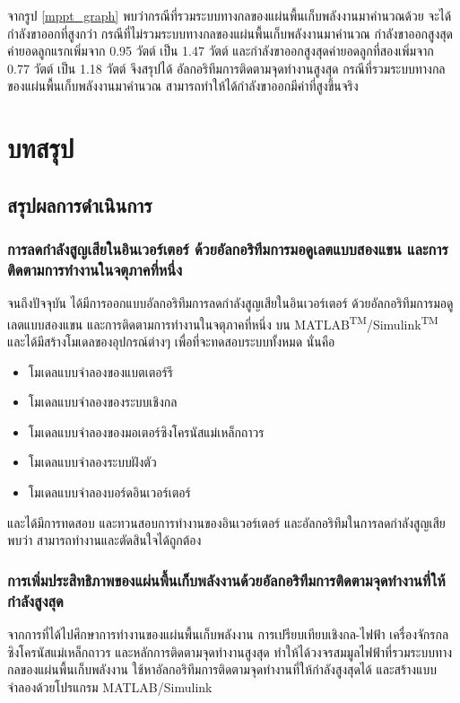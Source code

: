 \documentclass[11pt,a4paper]{article}
\begin{document}
จากรูป \ref{mppt_graph} พบว่ากรณีที่รวมระบบทางกลของแผ่นพื้นเก็บพลังงานมาคำนวณด้วย จะได้กำลังขาออกที่สูงกว่า กรณีที่ไม่รวมระบบทางกลของแผ่นพื้นเก็บพลังงานมาคำนวณ
กำลังขาออกสูงสุดค่ายอดลูกแรกเพิ่มจาก 0.95 วัตต์ เป็น 1.47 วัตต์ และกำลังขาออกสูงสุดค่ายอดลูกที่สองเพิ่มจาก 0.77 วัตต์ เป็น 1.18 วัตต์ จึงสรุปได้ อัลกอริทึมการติดตามจุดทำงานสูงสุด กรณีที่รวมระบบทางกลของแผ่นพื้นเก็บพลังงานมาคำนวณ สามารถทำให้ได้กำลังขาออกมีค่าที่สูงขึ้นจริง

\newpage
\section{บทสรุป}
\subsection{สรุปผลการดำเนินการ}

\subsubsection{การลดกำลังสูญเสียในอินเวอร์เตอร์ ด้วยอัลกอริทึมการมอดูเลตแบบสองแขน และการติดตามการทำงานในจตุภาคที่หนึ่ง}

จนถึงปัจจุบัน ได้มีการออกแบบอัลกอริทึมการลดกำลังสูญเสียในอินเวอร์เตอร์ ด้วยอัลกอริทึมการมอดูเลตแบบสองแขน และการติดตามการทำงานในจตุภาคที่หนึ่ง บน MATLAB\textsuperscript{TM}/Simulink\textsuperscript{TM} และได้มีสร้างโมเดลของอุปกรณ์ต่างๆ เพื่อที่จะทดสอบระบบทั้งหมด นั่นคือ

\begin{itemize}
    \item โมเดลแบบจำลองของแบตเตอร์รี
    \item โมเดลแบบจำลองของระบบเชิงกล
    \item โมเดลแบบจำลองของมอเตอร์ซิงโครนัสแม่เหล็กถาวร
    \item โมเดลแบบจำลองระบบฝังตัว
    \item โมเดลแบบจำลองบอร์ดอินเวอร์เตอร์
\end{itemize}

และได้มีการทดสอบ และทวนสอบการทำงานของอินเวอร์เตอร์ และอัลกอริทึมในการลดกำลังสูญเสีย พบว่า สามารถทำงานและตัดสินใจได้ถูกต้อง

\subsubsection{การเพิ่มประสิทธิภาพของแผ่นพื้นเก็บพลังงานด้วยอัลกอริทึมการติดตามจุดทำงานที่ให้กำลังสูงสุด}
จากการที่ได้ไปศึกษาการทำงานของแผ่นพื้นเก็บพลังงาน การเปรียบเทียบเชิงกล-ไฟฟ้า เครื่องจักรกลซิงโครนัสแม่เหล็กถาวร และหลักการติดตามจุดทำงานสูงสุด
ทำให้ได้วงจรสมมูลไฟฟ้าที่รวมระบบทางกลของแผ่นพื้นเก็บพลังงาน ใช้หาอัลกอริทึมการติดตามจุดทำงานที่ให้กำลังสูงสุดได้ และสร้างแบบจำลองด้วยโปรแกรม MATLAB/Simulink
\end{document}
